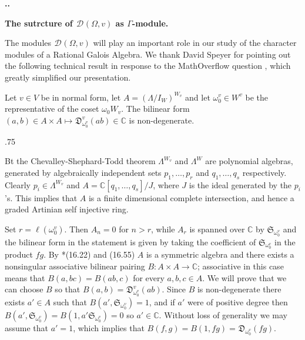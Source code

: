 \documentclass[11pt,fleqn]{amsart}
\makeatletter
\renewcommand\thesection{\arabic{section}}
\renewcommand\proofname{Proof}
\renewenvironment{proof}[1][\textit{\proofname}]{\par
 \pushQED{\qed}%
 \normalfont \topsep.75\paraskip\relax
 \trivlist
 \item[\hskip\labelsep
 \itshape
 #1\@addpunct{.}]\ignorespaces
}{%
 \popQED\endtrivlist\@endpefalse
}
\newcounter{para}[section]
\renewcommand\thepara{\thesection.\arabic{para}}
\def\paragraph{%
 \noindent
 \refstepcounter{para}%
 \textbf{\thepara.}\hspace{1ex}%
}
\newcommand\about[1]{%
 {\bfseries#1.}%
}
\newcommand\CC{\mathbb C}
\renewcommand\to{\longrightarrow}
\newcommand\D[3]{{}^{#1} \mathfrak D_{#2}^{#3}}
\newcommand\DD[3]{{}^{#1} \mathcal D_{#2}^{#3}}
\renewcommand\SS{\mathfrak S}
\makeatother
\begin{document}
\paragraph 
\about{The sutrcture of $\DD{}{}{}(\Omega, v)$ as $\Gamma$-module}
The modules $\DD{}{}{}(\Omega, v)$ will play an important role in our study
of the character modules of a Rational Galois Algebra. We thank David Speyer
for pointing out the following technical result in response to the 
MathOverflow question \cite{MathOver}, which greatly simplified
our presentation.
\begin{Lemma}
\label{L:speyer-lemma}
Let $v \in V$ be in normal form, let $A = (\Lambda / I_W)^{W_v}$ and let
$\omega_0^v \in W^v$ be the representative of the coset $\omega_0 W_v$.
The bilinear form $(a,b) \in A \times A \mapsto \D{}{\omega_0^v}{v}(ab) 
\in \CC$ is non-degenerate.
\end{Lemma}
\begin{proof}
Bt the Chevalley-Shephard-Todd theorem $\Lambda^{W_v}$ and $\Lambda^W$ are 
polynomial algebras, generated by algebraically independent sets $p_1, \ldots,
p_r$ and $q_1, \ldots, q_s$ respectively. Clearly $p_i \in \Lambda^{W_v}$ and 
$A = \CC[q_1, \ldots, q_s]/ J$, where $J$ is the ideal generated by the 
$p_i$'s. This implies that $A$ is a finite dimensional complete intersection,
and hence a graded Artinian self injective ring. 

Set $r = \ell(\omega_0^v)$. Then $A_n = 0$ for $n > r$, while $A_r$ is spanned
over $\CC$ by $\SS_{\omega_0^v}$ and the bilinear form in the statement is 
given by taking the coefficient of $\SS_{\omega_0^v}$ in the product $fg$.
By \cite{Lam-modules-book}*{(16.22) and (16.55)} $A$ is a symmetric algebra 
and there exists a nonsingular associative bilinear pairing $B: A \times A 
\to \CC$; associative in this case means that $B(a,bc) = B(ab,c)$ for every 
$a,b,c \in A$. We will prove that we can choose $B$ so that $B(a,b) = 
\D{}{\omega_0^v}{v}(ab)$. Since $B$ is non-degenerate there exists $a' \in A$ 
such that $B(a',\SS_{\omega^v_0}) = 1$, and if $a'$ were of positive degree 
then $B(a',\SS_{\omega_0^v}) = B(1, a' \SS_{\omega^v_0}) = 0$ so $a' \in \CC$. 
Without loss of generality we may assume that $a' = 1$, which implies that 
$B(f,g) = B(1,fg) = \D{}{\omega_0^v}{}(fg)$.
\end{proof}
\end{document}

